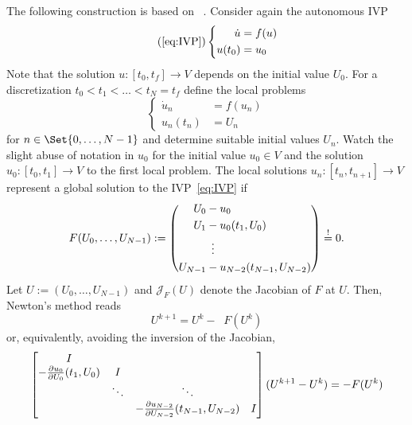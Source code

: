 The following construction is based on \citeauthor{Gander2007}~\cite{Gander2007}.
Consider again the autonomous \ac{IVP}
\begin{equation}
  \tag{\ref*{eq:IVP}}
  \left\{
  \begin{aligned}
    \dot u &= f(u) \\
    u(t_0) &= u_0
  \end{aligned}
  \right.
\end{equation}
Note that the solution $u : [t_0,t_f] \to V $ depends on the initial value $U_0$.
For a discretization $t_0 < t_1 < \ldots < t_N = t_f$
define the local problems
\begin{equation}
  \left\{
  \begin{aligned}
    \dot u_n &= f(u_n) \\
    u_n(t_n) &= U_n
  \end{aligned}
  \right.
\end{equation}
for $n \in \Set{0,\ldots,N-1}$
and determine suitable initial values $U_n$.
Watch the slight abuse of notation in $u_0$
for the initial value $u_0 \in V$
and the solution $u_0 : [t_0,t_1] \to V$ to the first local problem.
The local solutions $u_n : [t_n,t_{n+1}] \to V$ represent a global solution to the \ac{IVP}~\eqref{eq:IVP} if
\begin{equation}
  F(U_0, \ldots, U_{N-1}) :=
  \left(
  \begin{aligned}
    U_0 &- u_0 \\
    U_1 &- u_0(t_1, U_0) \\
    &\vdotswithin{-} \\
    U_{N-1} &- u_{N-2}(t_{N-1}, U_{N-2})
  \end{aligned}
  \right)
  \overset{!}{=} 0.
\end{equation}
Let $U := (U_0, \ldots, U_{N-1})$ and $\mathcal J_F(U)$ denote the Jacobian of $F$ at $U$.
Then, Newton's method reads
\begin{equation}
  U^{k+1} = U^k - \mathop{\mathcal J_F(U^k)^{-1}} F(U^k)
\end{equation}
or, equivalently, avoiding the inversion of the Jacobian,
\begin{equation}
  \begin{bmatrix}
    I \\
    -\pdiff{U_0}{u_0}(t_1, U_0) & I \\
    & \ddots & \ddots \\
    && -\pdiff{U_{N-2}}{u_{N-2}}(t_{N-1}, U_{N-2}) & I
  \end{bmatrix}
  (U^{k+1} - U^k) = -F(U^k)
\end{equation}
